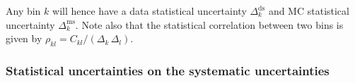 Any bin $k$ will hence have a data statistical uncertainty $\Delta_k^\mathrm{ds}$ and MC statistical uncertainty $\Delta_k^\mathrm{ms}$.
Note also that the statistical correlation between two bins is given by $\rho_{kl} = C_{kl}/(\Delta_k\,\Delta_l).$




\subsubsection{Statistical uncertainties on the systematic uncertainties}
\label{sec:uncertaintyuncertainty}


